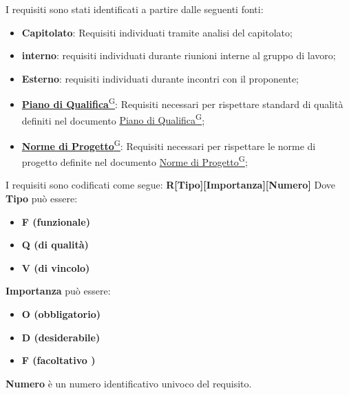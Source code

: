 I requisiti sono stati identificati a partire dalle seguenti fonti:
\begin{itemize}
    \item \textbf{Capitolato}: Requisiti individuati tramite analisi del capitolato;
    \item \textbf{interno}: requisiti individuati durante riunioni interne al gruppo di lavoro;
    \item \textbf{Esterno}: requisiti individuati durante incontri con il proponente;
    \item \href{https://code7crusaders.github.io/docs/RTB/documentazione_interna/glossario.html#piano-di-qualifica}{\textbf{Piano di Qualifica}\textsuperscript{G}}: Requisiti necessari per rispettare standard di qualità definiti nel documento \href{https://code7crusaders.github.io/docs/RTB/documentazione_interna/glossario.html#piano-di-qualifica}{Piano di Qualifica\textsuperscript{G}};
    \item \href{https://code7crusaders.github.io/docs/RTB/documentazione_interna/glossario.html#norme-di-progetto}{\textbf{Norme di Progetto}\textsuperscript{G}}: Requisiti necessari per rispettare le norme di progetto definite nel documento \href{https://code7crusaders.github.io/docs/RTB/documentazione_interna/glossario.html#norme-di-progetto}{Norme di Progetto\textsuperscript{G}};
\end{itemize}

I requisiti sono codificati come segue: \textbf{R[Tipo][Importanza][Numero]}
\newline
Dove \textbf{Tipo} può essere:
\begin{itemize}
    \item \textbf{F (funzionale)}
    \item \textbf{Q (di qualità)}
    \item \textbf{V (di vincolo)}
\end{itemize}
\textbf{Importanza} può essere:
\begin{itemize}
    \item \textbf{O (obbligatorio)}
    \item \textbf{D (desiderabile)}
    \item \textbf{F (facoltativo )}
\end{itemize}
\textbf{Numero} è un numero identificativo univoco del requisito.


